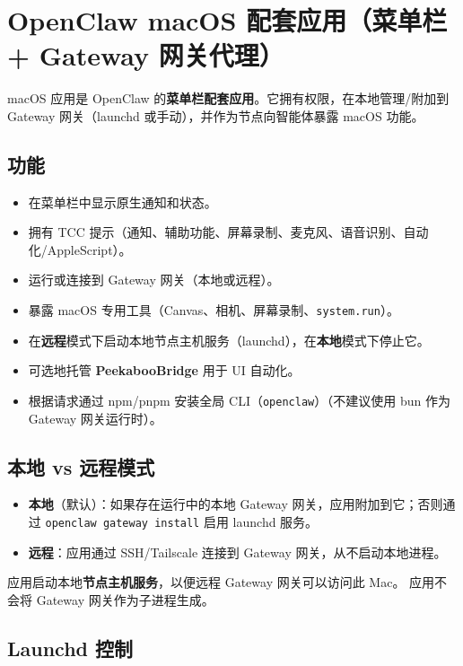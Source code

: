 \clearpage

\section{OpenClaw macOS 配套应用（菜单栏 + Gateway 网关代理）}


macOS 应用是 OpenClaw 的\textbf{菜单栏配套应用}。它拥有权限，在本地管理/附加到 Gateway 网关（launchd 或手动），并作为节点向智能体暴露 macOS 功能。

\subsection{功能}


\begin{itemize}
  \item 在菜单栏中显示原生通知和状态。
  \item 拥有 TCC 提示（通知、辅助功能、屏幕录制、麦克风、语音识别、自动化/AppleScript）。
  \item 运行或连接到 Gateway 网关（本地或远程）。
  \item 暴露 macOS 专用工具（Canvas、相机、屏幕录制、\texttt{system.run}）。
  \item 在\textbf{远程}模式下启动本地节点主机服务（launchd），在\textbf{本地}模式下停止它。
  \item 可选地托管 \textbf{PeekabooBridge} 用于 UI 自动化。
  \item 根据请求通过 npm/pnpm 安装全局 CLI（\texttt{openclaw}）（不建议使用 bun 作为 Gateway 网关运行时）。
\end{itemize}


\subsection{本地 vs 远程模式}


\begin{itemize}
  \item \textbf{本地}（默认）：如果存在运行中的本地 Gateway 网关，应用附加到它；否则通过 \texttt{openclaw gateway install} 启用 launchd 服务。
  \item \textbf{远程}：应用通过 SSH/Tailscale 连接到 Gateway 网关，从不启动本地进程。
\end{itemize}

应用启动本地\textbf{节点主机服务}，以便远程 Gateway 网关可以访问此 Mac。
应用不会将 Gateway 网关作为子进程生成。

\subsection{Launchd 控制}


